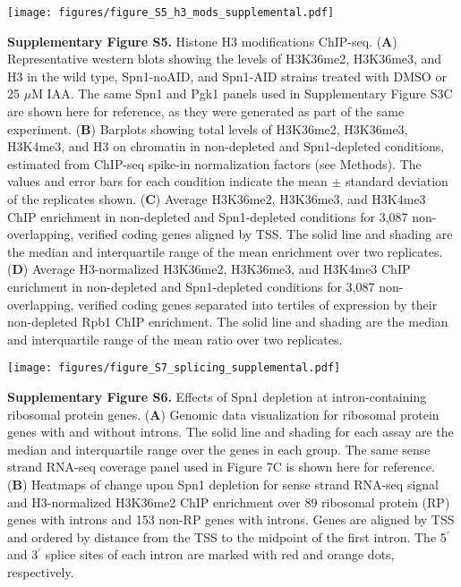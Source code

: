 \documentclass[8pt]{extarticle}
\begin{document}
\newpage


{\texttt{[image: figures/figure\_S5\_h3\_mods\_supplemental.pdf]}\par}

\vspace{2em}
\textbf{Supplementary Figure S5.} Histone H3 modifications ChIP-seq.
(\textbf{A}) Representative western blots showing the levels of H3K36me2, H3K36me3, and H3 in the wild type, Spn1-noAID, and Spn1-AID strains treated with DMSO or 25 $\mu$M IAA.
The same Spn1 and Pgk1 panels used in Supplementary Figure S3C are shown here for reference, as they were generated as part of the same experiment.
(\textbf{B}) Barplots showing total levels of H3K36me2, H3K36me3, H3K4me3, and H3 on chromatin in non-depleted and Spn1-depleted conditions, estimated from ChIP-seq spike-in normalization factors (see Methods).
The values and error bars for each condition indicate the mean $\pm$ standard deviation of the replicates shown.
(\textbf{C}) Average H3K36me2, H3K36me3, and H3K4me3 ChIP enrichment in non-depleted and Spn1-depleted conditions for 3,087 non-overlapping, verified coding genes aligned by TSS.
The solid line and shading are the median and interquartile range of the mean enrichment over two replicates.
(\textbf{D}) Average H3-normalized H3K36me2, H3K36me3, and H3K4me3 ChIP enrichment in non-depleted and Spn1-depleted conditions for 3,087 non-overlapping, verified coding genes separated into tertiles of expression by their non-depleted Rpb1 ChIP enrichment.
The solid line and shading are the median and interquartile range of the mean ratio over two replicates.

\newpage





{\texttt{[image: figures/figure\_S7\_splicing\_supplemental.pdf]}\par}

\vspace{2em}
\textbf{Supplementary Figure S6.} Effects of Spn1 depletion at intron-containing ribosomal protein genes.
(\textbf{A}) Genomic data visualization for ribosomal protein genes with and without introns.
The solid line and shading for each assay are the median and interquartile range over the genes in each group.
The same sense strand RNA-seq coverage panel used in Figure 7C is shown here for reference.
(\textbf{B}) Heatmaps of change upon Spn1 depletion for sense strand RNA-seq signal and H3-normalized H3K36me2 ChIP enrichment over 89 ribosomal protein (RP) genes with introns and 153 non-RP genes with introns.
Genes are aligned by TSS and ordered by distance from the TSS to the midpoint of the first intron.
The 5$^\prime$ and 3$^\prime$ splice sites of each intron are marked with red and orange dots, respectively.

\newpage
\end{document}
